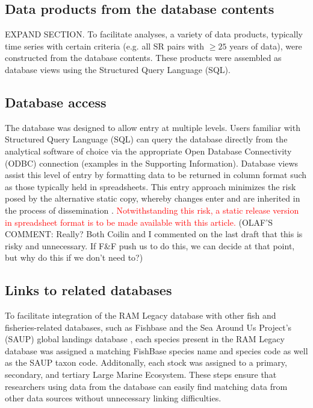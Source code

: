 \documentclass[letterpaper,12pt]{article}
\begin{document}
\subsection{Data products from the database contents}
EXPAND SECTION. To facilitate analyses, a variety of data products, typically time series with certain criteria (e.g. all SR pairs with $\ge25$ years of data), were constructed
from the database contents. These products were assembled as database
views using the Structured Query Language (SQL).

\subsection{Database access}
The database was designed to allow entry at multiple levels. Users
familiar with Structured Query Language (SQL) can query the database
directly from the analytical software of choice via the appropriate
Open Database Connectivity (ODBC) connection (examples in the
Supporting Information). Database views assist this level of entry by
formatting data to be returned in column format such as those
typically held in spreadsheets. This entry approach minimizes the risk
posed by the alternative static copy, whereby changes enter and are
inherited in the process of dissemination \citep[for a literary example]{Barbrook:Howe:Blake:Robinson:1998:nature}.
\textcolor{red}{Notwithstanding this risk, a static release version in spreadsheet
format is to be made available with this article.} (OLAF'S COMMENT: Really?  Both Coilin and I commented on the last draft that this is risky and unnecessary.  If F\&F push us to do this, we can decide at that point, but why do this if we don’t need to?)

\subsection{ Links to related databases}
To facilitate integration of the RAM Legacy database with other fish
and fisheries-related databases, such as Fishbase
\citep{Froese:Pauly:2009:fishbase} and the Sea Around Us Project's
(SAUP) global landings database \citep{Watson:etal:2005:fandf}, each species present in the RAM
Legacy database was assigned a matching FishBase species name and
species code as well as the SAUP taxon code. Additonally, each stock
was assigned to a primary, secondary, and tertiary Large Marine
Ecosystem. These steps ensure that researchers using data from the
database can easily find matching data from other data sources without
unnecessary linking difficulties.
\end{document}
